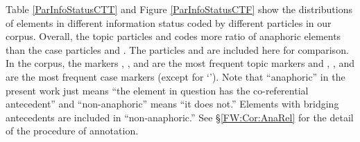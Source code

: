 Table \ref{ParInfoStatusCTT} and Figure \ref{ParInfoStatusCTF} show the distributions of elements in different information status coded by different particles in our corpus.
Overall, the topic particles  and  codes more ratio of anaphoric elements than the case particles  and .
The particles  and  are included here for comparison.
In the corpus, the markers , , and  are the most frequent topic markers and 
, , and  are the most frequent case markers (except for  `').
Note that ``anaphoric'' in the present work just means ``the element in question has the co-referential antecedent'' and ``non-anaphoric'' means ``it does not.''
Elements with bridging antecedents are included in ``non-anaphoric.''
See \S \ref{FW:Cor:AnaRel} for the detail of the procedure of annotation.

